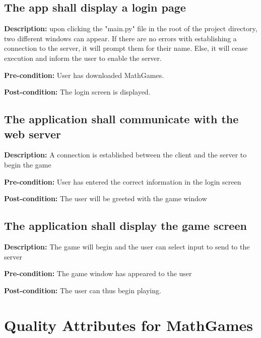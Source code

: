 \documentclass[12pt]{article}
\begin{document}
\begin{flushleft}

\subsection{The app shall display a login page}

\textbf{Description:} upon clicking the "main.py" file in the root of the project directory, two different windows can appear. If there are no errors with establishing a connection to the server, it will prompt them for their name. Else, it will cease execution and inform the user to enable the server.

\textbf{Pre-condition:} User has downloaded MathGames.

\textbf{Post-condition:} The login screen is displayed.


\subsection{The application shall communicate with the web server}

\textbf{Description:} A connection is established between the client and the server to begin the game

\textbf{Pre-condition:} User has entered the correct information in the login screen

\textbf{Post-condition:} The user will be greeted with the game window

\subsection{The application shall display the game screen}

\textbf{Description:} The game will begin and the user can select input to send to the server

\textbf{Pre-condition:} The game window has appeared to the user

\textbf{Post-condition:} The user can thus begin playing.

\end{flushleft}

\newpage

\section{Quality Attributes for MathGames}
\end{document}
